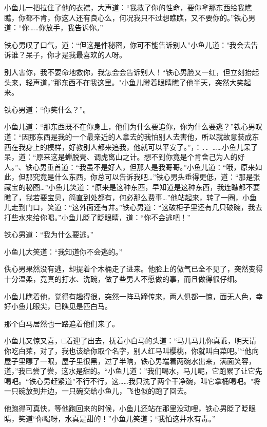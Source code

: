 \documentclass[12pt,oneside]{book}
\begin{document}
小鱼儿一把拉住了他的衣襟，大声道：``我救了你的性命，要你拿那东西给我瞧瞧，你都不肯，你这人还有良心么，何况我只不过想瞧瞧，又不要你的。''铁心男道：``你\ldots\ldots 你放手，我告诉你。''

铁心男叹了口气，道：``但这是件秘密，你可不能告诉别人''小鱼儿道："我会去告诉谁？呆子，你才是我最喜欢的人呀。

别人害你，我不要命地救你，我怎会会告诉别人！``铁心男脸又一红，但立刻抬起头来，轻声道，''那东西不在我这里。"小鱼儿瞪着眼睛瞧了他半天，突然大笑起来。

铁心男道：``你笑什么？''。

小鱼儿道：``那东西既不在你身上，他们为什么要追你，你为什么要逃？''铁心男叹道：``因那东西是我的一个最亲近的人拿去的我怕别人去害他，所以就故意装成东西在我身上的模样，好教别人都来追我，他就可以平安了。''，：．．\ldots\ldots 小鱼儿呆了呆，道：``原来这是蝉脱壳、调虎离山之计。想不到你竟是个肯舍己为人的好人。''、铁心男垂首道：``我虽不是好人，但那人是我哥哥。''小鱼儿道：``哦，原来如此，但那究竟是什么东西，你总可以告诉我吧\ldots{}''铁心男头垂得更低，道：``那是张藏宝的秘图\ldots{}''小鱼儿笑道：``原来是这种东西，早知道是这种东西，我连瞧都不要瞧了，我若要宝贝，简直到处都有，何必那么费事\ldots{}''他站起来，转了一圈，小鱼儿走到门口，笑道：``这外面还有井。''铁心男道：``这破柜子里还有几只破碗，我去打些水来给你喝。''小鱼儿眨了眨眼睛，道：``你不会逃吧！''

铁心男道：``我为什么要逃。''

小鱼儿大笑道：``我知道你不会逃的。''

佚心男果然没有逃，却提着个木桶走了进来。他脸上的傲气已全不见了，突然变得十分温柔，竟真的打水、洗碗，做了些男人不愿做的事，而且做得很仔细。

小鱼儿瞧着他，觉得有趣得很，突然一阵马蹄传来，两人俱都一惊，面无人色，幸好小鱼儿眼尖，已瞧见是匹白马。

那个白马居然也一路追着他们来了。

小鱼儿又惊又喜，□着迎了出去，抚着小白马的头道：``马儿马儿你真乖，明天请你吃白莱，对了，我也该给你取个名字，别人红马叫樱桃，你就叫白菜吧。''``他向屋子里瞟了一眼，屋子里很黑，过了半晌，铁心男端着两碗水出来，满面笑容，道，''我已尝了尝，这水是甜的。``小鱼儿道：''我们喝水，马儿呢，它跑累了让它先喝吧。``铁心男赶紧道''不行不行，这\ldots\ldots 我只洗了两个干净碗，叫它拿桶喝吧。"将一只碗放到井边，一只碗交给小鱼儿，飞也似的跑了回去。

他跑得可真快，等他跑回来的时候，小鱼儿还站在那里没动哩，铁心男眨了眨眼睛，笑道``你喝呀，水真是甜的！''小鱼儿笑道；``我怕这井水有毒。''
\end{document}
